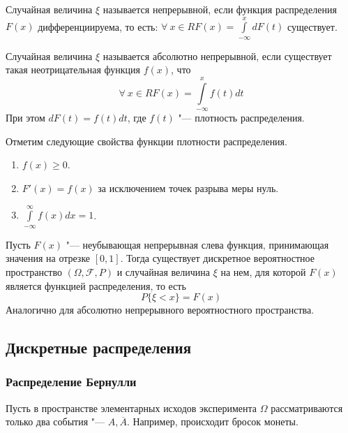 \begin{definition}
    Случайная величина $\xi$ называется непрерывной,
    если функция распределения $F(x)$ дифференциируема, то есть:
    $\forall ~ x \in R F(x) = \int\limits_{-\infty}^x dF(t)$ существует.
\end{definition}

\begin{definition}
    Случайная величина $\xi$ называется абсолютно непрерывной, если
    существует такая неотрицательная функция $f(x)$, что
    \begin{equation*}
        \forall ~ x \in R F(x) = \int\limits_{-\infty}^x f(t)dt
    \end{equation*}
    При этом $dF(t) = f(t)dt$, где $f(t)$ "--- плотность распределения.
\end{definition}

\begin{theorem}
    Отметим следующие свойства функции плотности распределения.
    \begin{enumerate}
        \item $f(x) \geq 0$.
        \item $F'(x) = f(x)$ за исключением точек разрыва меры нуль.
        \item $\int\limits_{-\infty}^{\infty}f(x)dx = 1$.
    \end{enumerate}
\end{theorem}

\begin{theorem}
    Пусть $F(x)$ "--- неубывающая непрерывная слева функция,
    принимающая значения на отрезке $[0, 1]$. Тогда
    существует дискретное вероятностное пространство $(\Omega, \mathcal{F}, P)$
    и случайная величина $\xi$ на нем, для которой $F(x)$ является
    функцией распределения, то есть 
    \begin{equation*}
    P\{\xi < x\} = F(x)
    \end{equation*}
    Аналогично для абсолютно непрерывного вероятностного пространства.
\end{theorem}

\subsection{Дискретные распределения}
\subsubsection{Распределение Бернулли}
Пусть в пространстве элементарных исходов
эксперимента $\Omega$ рассматриваются только
два события "--- $A, \overline{A}$. Например,
происходит бросок монеты. 


